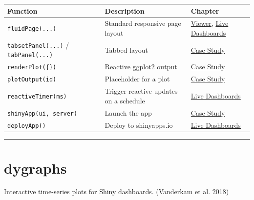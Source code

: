 \documentclass[
  11pt,
  letterpaper,
  DIV=11,
  numbers=noendperiod]{scrreprt}
\begin{document}
\begin{longtable}[]{@{}
  >{\raggedright\arraybackslash}p{}
  >{\raggedright\arraybackslash}p{}
  >{\raggedright\arraybackslash}p{}@{}}
\toprule\noalign{}
\begin{minipage}[b]{\linewidth}\raggedright
Function
\end{minipage} & \begin{minipage}[b]{\linewidth}\raggedright
Description
\end{minipage} & \begin{minipage}[b]{\linewidth}\raggedright
Chapter
\end{minipage} \\
\midrule\noalign{}
\endhead
\bottomrule\noalign{}
\endlastfoot
\texttt{fluidPage(...)} & Standard responsive page layout &
\hyperref[viewer]{Viewer}, \hyperref[live-dashboards]{Live
Dashboards} \\
\texttt{tabsetPanel(...)} / \texttt{tabPanel(...)} & Tabbed layout &
\hyperref[case-study-dwg-to-shiny-dashboard]{Case Study} \\
\texttt{renderPlot(\{\})} & Reactive ggplot2 output &
\hyperref[case-study-dwg-to-shiny-dashboard]{Case Study} \\
\texttt{plotOutput(id)} & Placeholder for a plot &
\hyperref[case-study-dwg-to-shiny-dashboard]{Case Study} \\
\texttt{reactiveTimer(ms)} & Trigger reactive updates on a schedule &
\hyperref[live-dashboards]{Live Dashboards} \\
\texttt{shinyApp(ui,\ server)} & Launch the app &
\hyperref[case-study-dwg-to-shiny-dashboard]{Case Study} \\
\texttt{deployApp()} & Deploy to shinyapps.io &
\hyperref[live-dashboards]{Live Dashboards} \\
\end{longtable}

\begin{center}\rule{0.5\linewidth}{0.5pt}\end{center}

\section{dygraphs}\label{dygraphs}

Interactive time-series plots for Shiny dashboards. (Vanderkam et al.
2018)
\end{document}
